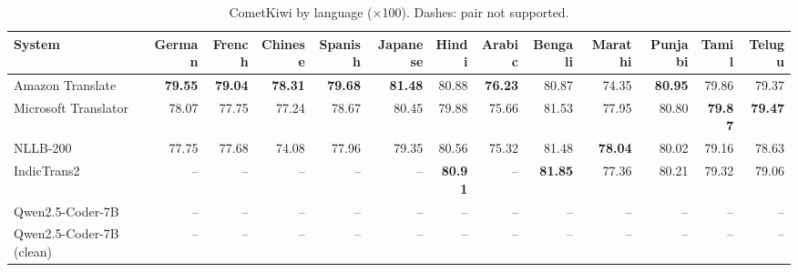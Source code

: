 \begin{table}[t]
\centering
\caption{CometKiwi by language ($\times$100). Dashes: pair not supported.\label{tab:cometkiwi_lang}}
\begin{tabular}{lrrrrrrrrrrrr}
\toprule
System & German & French & Chinese & Spanish & Japanese & Hindi & Arabic & Bengali & Marathi & Punjabi & Tamil & Telugu \\
\midrule
Amazon Translate & \textbf{79.55} & \textbf{79.04} & \textbf{78.31} & \textbf{79.68} & \textbf{81.48} & 80.88 & \textbf{76.23} & 80.87 & 74.35 & \textbf{80.95} & 79.86 & 79.37 \\
Microsoft Translator & 78.07 & 77.75 & 77.24 & 78.67 & 80.45 & 79.88 & 75.66 & 81.53 & 77.95 & 80.80 & \textbf{79.87} & \textbf{79.47} \\
NLLB-200 & 77.75 & 77.68 & 74.08 & 77.96 & 79.35 & 80.56 & 75.32 & 81.48 & \textbf{78.04} & 80.02 & 79.16 & 78.63 \\
IndicTrans2 & -- & -- & -- & -- & -- & \textbf{80.91} & -- & \textbf{81.85} & 77.36 & 80.21 & 79.32 & 79.06 \\
Qwen2.5-Coder-7B & -- & -- & -- & -- & -- & -- & -- & -- & -- & -- & -- & -- \\
Qwen2.5-Coder-7B (clean) & -- & -- & -- & -- & -- & -- & -- & -- & -- & -- & -- & -- \\
\bottomrule
\end{tabular}
\end{table}
